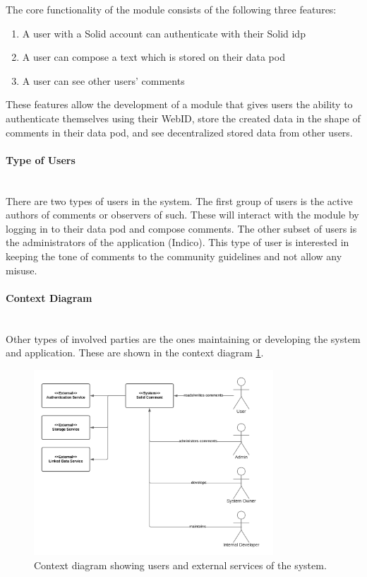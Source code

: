 The core functionality of the module consists of the following three features: 
\vspace{-3mm}
\begin{enumerate}
    \item A user with a Solid account can authenticate with their Solid \gls{idp}
    \item A user can compose a text which is stored on their data pod
    \item A user can see other users’ comments
\end{enumerate}
\vspace{-3mm}

These features allow the development of a module that gives users the ability to authenticate themselves using their WebID, store the created data in the shape of comments in their data pod, and see decentralized stored data from other users.
\vspace{0.5cm}
\paragraph{Type of Users}\mbox{}\\

There are two types of users in the system. The first group of users is the active authors of comments or observers of such. These will interact with the module by logging in to their data pod and compose comments. The other subset of users is the administrators of the application (Indico). This type of user is interested in keeping the tone of comments to the community guidelines and not allow any misuse.
\vspace{0.5cm}
\paragraph{Context Diagram}\mbox{}\\

Other types of involved parties are the ones maintaining or developing the system and application. These are shown in the context diagram \ref{fig:poc-comment-context_diagram}.

\begin{figure}[H]
    \centering
    \includegraphics[width=0.8\textwidth]{prototype/graphs/poc-comment-context_diagram.png}
    \caption{Context diagram showing users and external services of the system.}
    \label{fig:poc-comment-context_diagram}
\end{figure}
\vspace{0.5cm}
